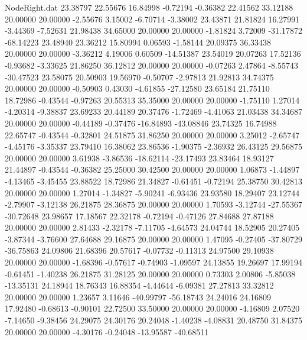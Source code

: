 \begin{filecontents}{NodeRight.dat}
  23.38797   22.55676   16.84998    -0.72194   -0.36382   22.41562   33.12188   20.00000   20.00000   -2.55676    3.15002   -6.70714   -3.38002
  23.43871   21.81824   16.27991    -3.44369   -7.52631   21.98438   34.65000   20.00000   20.00000   -1.81824    3.72009  -31.17872  -68.14223
  23.48940   23.36212   15.80994     0.06593   -1.58144   20.09375   36.33438   20.00000   20.00000   -3.36212    4.19006    0.60509  -14.51387
  23.54019   20.07263   17.52136    -0.93682   -3.33625   21.86250   36.12812   20.00000   20.00000   -0.07263    2.47864   -8.55743  -30.47523
  23.58075   20.50903   19.56970    -0.50707   -2.97813   21.92813   34.74375   20.00000   20.00000   -0.50903    0.43030   -4.61855  -27.12580
  23.65184   21.75110   18.72986    -0.43544   -0.97263   20.55313   35.35000   20.00000   20.00000   -1.75110    1.27014   -4.20314   -9.38837
  23.69233   20.44189   20.37476    -1.72469   -4.41063   21.03438   34.34687   20.00000   20.00000   -0.44189   -0.37476  -16.84893  -43.08846
  23.74325   16.74988   22.65747    -0.43544   -0.32801   24.51875   31.86250   20.00000   20.00000    3.25012   -2.65747   -4.45176   -3.35337
  23.79410   16.38062   23.86536    -1.90375   -2.36932   26.43125   29.56875   20.00000   20.00000    3.61938   -3.86536  -18.62114  -23.17493
  23.83464   18.93127   21.44897    -0.43544   -0.36382   25.25000   30.42500   20.00000   20.00000    1.06873   -1.44897   -4.13465   -3.45455
  23.88522   18.72986   21.34827    -0.61451   -0.72194   25.38750   30.42813   20.00000   20.00000    1.27014   -1.34827   -5.90241   -6.93436
  23.93580   18.29407   23.12744    -2.79907   -3.12138   26.21875   28.36875   20.00000   20.00000    1.70593   -3.12744  -27.55367  -30.72648
  23.98657   17.18567   22.32178    -0.72194   -0.47126   27.84688   27.87188   20.00000   20.00000    2.81433   -2.32178   -7.11705   -4.64573
  24.04744   18.52905   20.27405    -3.87344   -3.76600   27.64688   29.16875   20.00000   20.00000    1.47095   -0.27405  -37.80729  -36.75863
  24.09806   21.68396   20.57617    -0.07732   -0.11313   24.97500   29.10938   20.00000   20.00000   -1.68396   -0.57617   -0.74903   -1.09597
  24.13855   19.26697   17.99194    -0.61451   -1.40238   26.21875   31.28125   20.00000   20.00000    0.73303    2.00806   -5.85038  -13.35131
  24.18944   18.76343   16.88354    -4.44644   -6.09381   27.27813   33.32812   20.00000   20.00000    1.23657    3.11646  -40.99797  -56.18743
  24.24016   24.16809   17.92480    -0.68613   -0.90101   22.72500   33.50000   20.00000   20.00000   -4.16809    2.07520   -7.14650   -9.38456
  24.29075   24.30176   20.24048    -1.40238   -4.08831   20.48750   31.84375   20.00000   20.00000   -4.30176   -0.24048  -13.95587  -40.68511

\end{filecontents}
